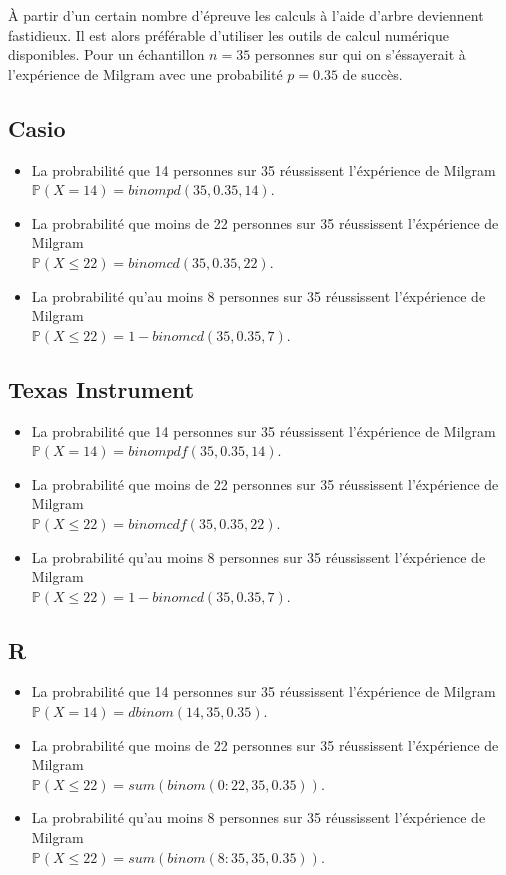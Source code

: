\documentclass[paper=a4, fontsize=9pt]{scrartcl} %
\begin{document}
À partir d'un certain nombre d'épreuve les calculs à l'aide d'arbre deviennent fastidieux. Il est alors préférable d'utiliser les outils de calcul numérique disponibles. Pour un échantillon $n=35$ personnes sur qui on s'éssayerait à l'expérience de Milgram avec une probabilité $p=0.35$ de succès.

\subsection{Casio}
\begin{itemize}
\item La probrabilité que 14 personnes sur 35 réussissent l'éxpérience de Milgram\\
$\mathbb{P}(X = 14) = binompd(35, 0.35, 14)$.
\item La probrabilité que moins de 22 personnes sur 35 réussissent l'éxpérience de Milgram\\
$\mathbb{P}(X \leq 22) = binomcd(35, 0.35, 22)$.
\item La probrabilité qu'au moins 8 personnes sur 35 réussissent l'éxpérience de Milgram\\
$\mathbb{P}(X \leq 22) = 1 - binomcd(35, 0.35, 7)$.
\end{itemize}



\subsection{Texas Instrument}
\begin{itemize}
\item La probrabilité que 14 personnes sur 35 réussissent l'éxpérience de Milgram\\
$\mathbb{P}(X = 14) = binompdf(35, 0.35, 14)$.
\item La probrabilité que moins de 22 personnes sur 35 réussissent l'éxpérience de Milgram\\
$\mathbb{P}(X \leq 22) = binomcdf(35, 0.35, 22)$.
\item La probrabilité qu'au moins 8 personnes sur 35 réussissent l'éxpérience de Milgram\\
$\mathbb{P}(X \leq 22) = 1 - binomcd(35, 0.35, 7)$.
\end{itemize}

\subsection{R}

\begin{itemize}
\item La probrabilité que 14 personnes sur 35 réussissent l'éxpérience de Milgram\\
$\mathbb{P}(X = 14) = dbinom(14, 35,  0.35)$.
\item La probrabilité que moins de 22 personnes sur 35 réussissent l'éxpérience de Milgram\\
$\mathbb{P}(X \leq 22) = sum(binom(0:22,35, 0.35))$.
\item La probrabilité qu'au moins 8 personnes sur 35 réussissent l'éxpérience de Milgram\\
$\mathbb{P}(X \leq 22) = sum(binom(8:35, 35, 0.35))$.
\end{itemize}
\end{document}
